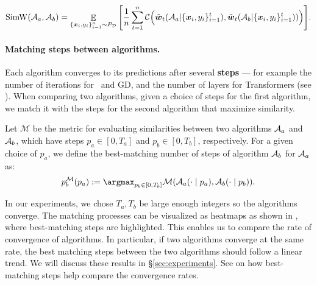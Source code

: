 \begin{equation*}
    \mathrm{SimW}({\mathcal{A}}_a, {\mathcal{A}}_b) =  \mathop{\mathbb E}_{\{\boldsymbol{x}_i, y_i\}_{i=1}^{n} \sim P_{\mathcal{D}}} \Bigg[
    \frac{1}{n} \sum_{t=1}^n
    {\mathcal{C}}\Big(\tilde{\boldsymbol{w}}_t({\mathcal{A}}_a | \{\boldsymbol{x}_i, y_i\}_{i=1}^t), \tilde{\boldsymbol{w}}_t({\mathcal{A}}_b | \{\boldsymbol{x}_i, y_i\}_{i=1}^t))\Big)\Bigg].
\end{equation*}



\paragraph{Matching steps between algorithms.} Each algorithm converges to its predictions after several \textbf{steps} --- for example the number of iterations for \newton\ and GD, and  the number of layers for Transformers (see ). 
When comparing two algorithms, given a choice of steps for the first algorithm, we match it with the steps for the second algorithm that maximize similarity. 
\begin{definition} Let $\mathcal M$ be the metric for evaluating similarities between two algorithms ${\mathcal{A}}_a$ and ${\mathcal{A}}_b$, which have steps $p_a \in [0, T_a]$ and $p_b \in [0, T_b]$, respectively. For a given choice of $p_a$, we define the best-matching number of steps of algorithm ${\mathcal{A}}_b$ for ${\mathcal{A}}_a$ as: 
\begin{equation}
    p_b^{\mathcal M}(p_a) := \argmax_{p_b \in [0, T_b]} \mathcal M(\calA_a(\cdot \mid p_a), \calA_b(\cdot \mid p_b)).
\end{equation} 
\vspace{-3.4mm}
\label{def:matching}
\end{definition}
In our experiments, we chose $T_a, T_b$ be large enough integers so the algorithms converge. The matching processes can be visualized as heatmaps as shown in , where best-matching steps are highlighted. This enables us to compare the rate of convergence of algorithms. 
In particular, if two algorithms converge at the same rate, the best matching steps between the two algorithms should follow a linear trend.
We will discuss these results in \S\ref{sec:experiments}. See  on how best-matching steps help compare the convergence rates.
